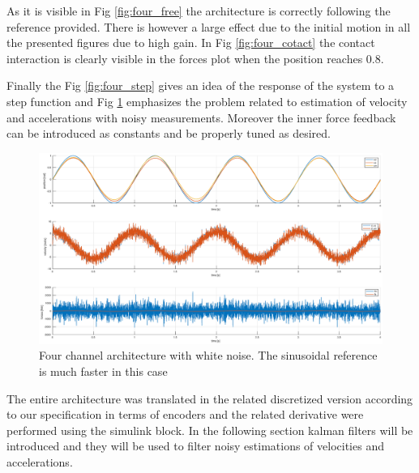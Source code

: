\documentclass[a4paper,12pt]{article}
\begin{document}
As it is visible in Fig \ref{fig:four_free} the architecture is correctly following the reference provided. There is however a large effect due to the initial motion in all the presented figures due to high gain. In Fig \ref{fig:four_cotact} the contact interaction is clearly visible in the forces plot when the position reaches 0.8. 

Finally the Fig \ref{fig:four_step} gives an idea of the response of the system to a step function and Fig \ref{fig:four_noisy} emphasizes the problem related to estimation of velocity and accelerations with noisy measurements. Moreover the inner force feedback can be introduced as constants and be properly tuned as desired.

\begin{figure}[H]
    \begin{center}
        \hspace*{-4.2cm}
        \includegraphics[scale=0.4]{images/four_noisy.eps}
    \end{center}
    \caption{Four channel architecture with white noise. The sinusoidal reference is much faster in this case}
    \label{fig:four_noisy}
\end{figure}

\noindent The entire architecture was translated in the related discretized version according to our specification in terms of encoders and the related derivative were performed using the simulink block. In the following section kalman filters will be introduced and they will be used to filter noisy estimations of velocities and accelerations.
\end{document}
